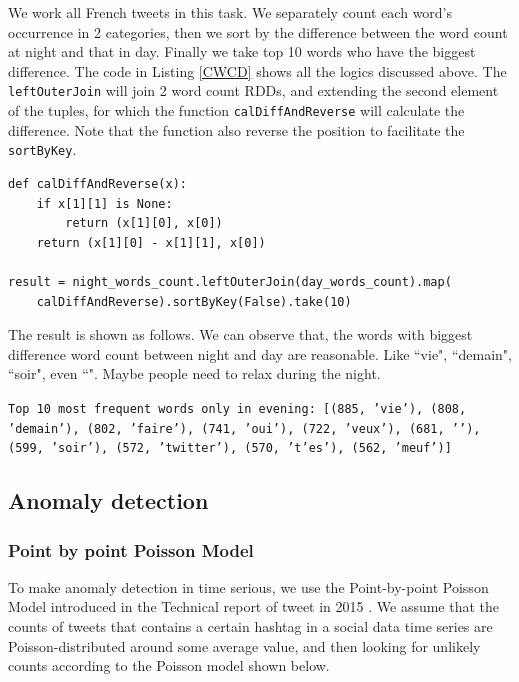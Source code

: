 We work all French tweets in this task. We separately count each word's occurrence in 2 categories, then we sort by the difference between the word count at night and that in day. Finally we take top 10 words who have the biggest difference. The code in Listing \ref{CWCD} shows all the logics discussed above. The \texttt{leftOuterJoin} will join 2 word count RDDs, and extending the second element of the tuples, for which the function \texttt{calDiffAndReverse} will calculate the difference. Note that the function also reverse the position to facilitate the \texttt{sortByKey}. 

\begin{lstlisting}[caption=Calculate word count difference, label={CWCD}]
def calDiffAndReverse(x):
    if x[1][1] is None:
        return (x[1][0], x[0])
    return (x[1][0] - x[1][1], x[0])
    
result = night_words_count.leftOuterJoin(day_words_count).map(
    calDiffAndReverse).sortByKey(False).take(10)
\end{lstlisting}

The result is shown as follows. We can observe that, the words with biggest difference word count between night and day are reasonable. Like ``vie", ``demain", ``soir", even ``". Maybe people need to relax during the night. 

\texttt{Top 10 most frequent words only in evening:
[(885, 'vie'), (808, 'demain'), (802, 'faire'), (741, 'oui'), (722, 'veux'), (681, ''), (599, 'soir'), (572, 'twitter'), (570, 't’es'), (562, 'meuf')]}



\subsection{Anomaly detection}
\label{anomalyDetection}

\subsubsection{Point by point Poisson Model}
\label{poissonModel}

To make anomaly detection in time serious, we use the Point-by-point Poisson Model introduced in the Technical report of tweet in 2015 \cite{trend2015}. We assume that the counts of tweets that contains a certain hashtag in a social data time series are Poisson-distributed around some average value, and then looking for unlikely counts according to the Poisson model shown below. 

